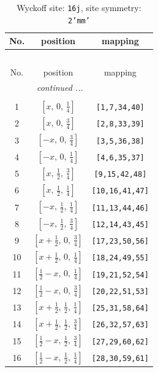\documentclass[fleqn,8pt]{jsarticle}
\begin{document}
\renewcommand{\arraystretch}{1.2}
\begin{longtable}{ccc}
\caption{Wyckoff site: {\tt 16j}, site symmetry: {\tt 2'mm'}}
 \\
 \hline \hline
No. & position & mapping \\ \hline \endfirsthead

\multicolumn{2}{l}{\tablename\ \thetable{}} \\
 \hline \hline
No. & position & mapping \\ \hline \endhead

 \hline \hline
\multicolumn{2}{r}{\footnotesize\it continued ...} \\ \endfoot

 \hline \hline
\multicolumn{2}{r}{} \\ \endlastfoot

1 & $\left[ x,\, 0,\, \frac{1}{4} \right]$ & {\tt [1,7,34,40]} \\ \hline
2 & $\left[ x,\, 0,\, \frac{3}{4} \right]$ & {\tt [2,8,33,39]} \\ \hline
3 & $\left[ - x,\, 0,\, \frac{3}{4} \right]$ & {\tt [3,5,36,38]} \\ \hline
4 & $\left[ - x,\, 0,\, \frac{1}{4} \right]$ & {\tt [4,6,35,37]} \\ \hline
5 & $\left[ x,\, \frac{1}{2},\, \frac{3}{4} \right]$ & {\tt [9,15,42,48]} \\ \hline
6 & $\left[ x,\, \frac{1}{2},\, \frac{1}{4} \right]$ & {\tt [10,16,41,47]} \\ \hline
7 & $\left[ - x,\, \frac{1}{2},\, \frac{1}{4} \right]$ & {\tt [11,13,44,46]} \\ \hline
8 & $\left[ - x,\, \frac{1}{2},\, \frac{3}{4} \right]$ & {\tt [12,14,43,45]} \\ \hline
9 & $\left[ x + \frac{1}{2},\, 0,\, \frac{3}{4} \right]$ & {\tt [17,23,50,56]} \\ \hline
10 & $\left[ x + \frac{1}{2},\, 0,\, \frac{1}{4} \right]$ & {\tt [18,24,49,55]} \\ \hline
11 & $\left[ \frac{1}{2} - x,\, 0,\, \frac{1}{4} \right]$ & {\tt [19,21,52,54]} \\ \hline
12 & $\left[ \frac{1}{2} - x,\, 0,\, \frac{3}{4} \right]$ & {\tt [20,22,51,53]} \\ \hline
13 & $\left[ x + \frac{1}{2},\, \frac{1}{2},\, \frac{1}{4} \right]$ & {\tt [25,31,58,64]} \\ \hline
14 & $\left[ x + \frac{1}{2},\, \frac{1}{2},\, \frac{3}{4} \right]$ & {\tt [26,32,57,63]} \\ \hline
15 & $\left[ \frac{1}{2} - x,\, \frac{1}{2},\, \frac{3}{4} \right]$ & {\tt [27,29,60,62]} \\ \hline
16 & $\left[ \frac{1}{2} - x,\, \frac{1}{2},\, \frac{1}{4} \right]$ & {\tt [28,30,59,61]} \\
\end{longtable}
\end{document}
